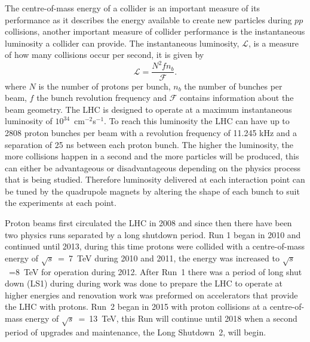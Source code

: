 
The centre-of-mass energy of a collider is an important measure of its performance as it describes the energy available to create new particles during $pp$ collisions, another important measure of collider performance is the instantaneous luminosity a collider can provide. The instantaneous luminosity, $\mathcal{L}$, is a measure of how many collisions occur per second, it is given by
\begin{equation}
\mathcal{L} = \frac{N^{2} f n_{b}}{\mathcal{F}}.
\label{eq:inst_lumi}
\end{equation}
where $N$ is the number of protons per bunch, $n_{b}$ the number of bunches per beam, $f$ the bunch revolution frequency and $\mathcal{F}$ contains information about the beam geometry. The LHC is designed to operate at a maximum instantaneous luminosity of $10^{34}$~cm$^{-2}$s$^{-1}$. To reach this luminosity the LHC can have up to 2808 proton bunches per beam with a revolution frequency of 11.245 kHz and a separation of 25 ns between each proton bunch. %
The higher the luminosity, the more collisions happen in a second and the more particles will be produced, this can either be advantageous or disadvantageous depending on the physics process that is being studied.
Therefore luminosity delivered at each interaction point can be tuned by the quadrupole magnets by altering the shape of each bunch to suit the experiments at each point.

Proton beams first circulated the LHC in 2008 and since then there have been two physics runs separated by a long shutdown period. Run 1 began in 2010 and continued until 2013, during this time protons were collided with a centre-of-mass energy of $\sqrt{s}$~=~7~TeV during 2010 and 2011, the energy was increased to $\sqrt{s}$~=8~TeV for operation during 2012. After Run~1 there was a period of long shut down (LS1) during during work was done to prepare the LHC to operate at higher energies and renovation work was preformed on accelerators that provide the LHC with protons. Run~2 began in 2015 with proton collisions at a centre-of-mass energy of $\sqrt{s}$~=~13~TeV, %
this Run will continue until 2018 when a second period of upgrades and maintenance, the Long Shutdown~2, will begin.




